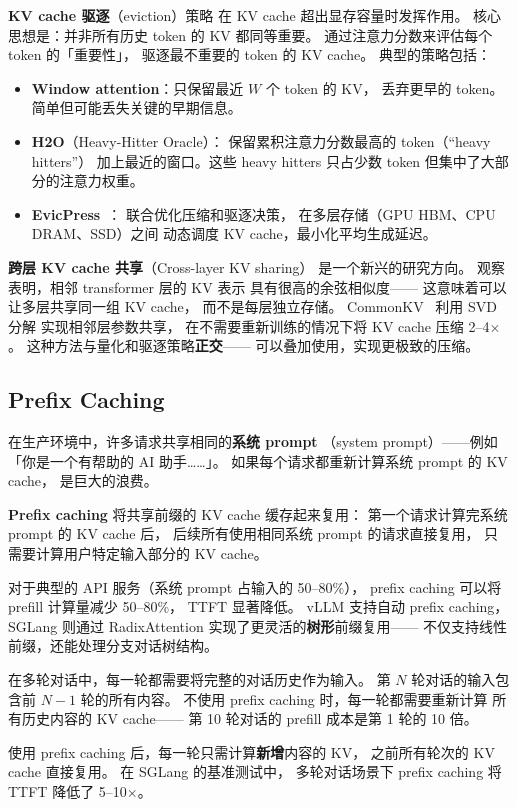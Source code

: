 \textbf{KV cache 驱逐}（eviction）策略
在 KV cache 超出显存容量时发挥作用。
核心思想是：并非所有历史 token 的 KV 都同等重要。
通过注意力分数来评估每个 token 的「重要性」，
驱逐最不重要的 token 的 KV cache。
典型的策略包括：
\begin{itemize}[noitemsep]
  \item \textbf{Window attention}：只保留最近 $W$ 个 token 的 KV，
        丢弃更早的 token。简单但可能丢失关键的早期信息。
  \item \textbf{H2O}（Heavy-Hitter Oracle）：
        保留累积注意力分数最高的 token（``heavy hitters''）
        加上最近的窗口。这些 heavy hitters 只占少数 token
        但集中了大部分的注意力权重。
  \item \textbf{EvicPress}~\cite{feng2024evicpress}：
        联合优化压缩和驱逐决策，
        在多层存储（GPU HBM、CPU DRAM、SSD）之间
        动态调度 KV cache，最小化平均生成延迟。
\end{itemize}

\textbf{跨层 KV cache 共享}（Cross-layer KV sharing）
是一个新兴的研究方向。
观察表明，相邻 transformer 层的 KV 表示
具有很高的余弦相似度——
这意味着可以让多层共享同一组 KV cache，
而不是每层独立存储。
CommonKV~\cite{wang2025commonkv} 利用 SVD 分解
实现相邻层参数共享，
在不需要重新训练的情况下将 KV cache 压缩 2--4$\times$。
这种方法与量化和驱逐策略\textbf{正交}——
可以叠加使用，实现更极致的压缩。

\subsection{Prefix Caching}

在生产环境中，许多请求共享相同的\textbf{系统 prompt}
（system prompt）——例如「你是一个有帮助的 AI 助手……」。
如果每个请求都重新计算系统 prompt 的 KV cache，
是巨大的浪费。

\textbf{Prefix caching} 将共享前缀的 KV cache 缓存起来复用：
第一个请求计算完系统 prompt 的 KV cache 后，
后续所有使用相同系统 prompt 的请求直接复用，
只需要计算用户特定输入部分的 KV cache。

对于典型的 API 服务（系统 prompt 占输入的 50--80\%），
prefix caching 可以将 prefill 计算量减少 50--80\%，
TTFT 显著降低。
vLLM 支持自动 prefix caching，
SGLang 则通过 RadixAttention 实现了更灵活的\textbf{树形}前缀复用——
不仅支持线性前缀，还能处理分支对话树结构。

\begin{whybox}
在多轮对话中，每一轮都需要将完整的对话历史作为输入。
第 $N$ 轮对话的输入包含前 $N-1$ 轮的所有内容。
不使用 prefix caching 时，每一轮都需要重新计算
所有历史内容的 KV cache——
第 10 轮对话的 prefill 成本是第 1 轮的 10 倍。

使用 prefix caching 后，每一轮只需计算\textbf{新增}内容的 KV，
之前所有轮次的 KV cache 直接复用。
在 SGLang 的基准测试中，
多轮对话场景下 prefix caching 将 TTFT 降低了 5--10$\times$。
\end{whybox}

